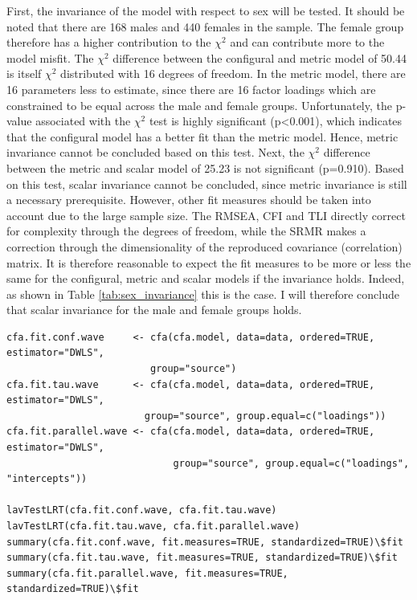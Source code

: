 \documentclass[11pt]{article}
\begin{document}
First, the invariance of the model with respect to sex will be tested. It
should be noted that there are 168 males and 440 females in the sample. The
female group therefore has a higher contribution to the $\chi^2$ and can
contribute more to the model misfit. The $\chi^2$ difference between the
configural and metric model of 50.44 is itself $\chi^2$ distributed with 16
degrees of freedom. In the metric model, there are 16 parameters less to
estimate, since there are 16 factor loadings which are constrained to be equal
across the male and female groups. Unfortunately, the p-value associated with
the $\chi^2$ test is highly significant (p<0.001), which indicates that the
configural model has a better fit than the metric model. Hence, metric
invariance cannot be concluded based on this test. Next, the $\chi^2$ difference
between the metric and scalar model of 25.23 is not significant (p=0.910). Based
on this test, scalar invariance cannot be concluded, since metric invariance is
still a necessary prerequisite. However, other fit measures should be taken into
account due to the large sample size. The RMSEA, CFI and TLI directly correct
for complexity through the degrees of freedom, while the SRMR makes a correction
through the dimensionality of the reproduced covariance (correlation) matrix.
It is therefore reasonable to expect the fit measures to be more or less
the same for the configural, metric and scalar models if the invariance holds.
Indeed, as shown in Table \ref{tab:sex_invariance} this is the case. I will
therefore conclude that scalar invariance for the male and female groups holds.

\begin{minipage}{\linewidth}
\begin{lstlisting}
cfa.fit.conf.wave     <- cfa(cfa.model, data=data, ordered=TRUE, estimator="DWLS",
                         group="source")
cfa.fit.tau.wave      <- cfa(cfa.model, data=data, ordered=TRUE, estimator="DWLS",
                        group="source", group.equal=c("loadings"))
cfa.fit.parallel.wave <- cfa(cfa.model, data=data, ordered=TRUE, estimator="DWLS",
                             group="source", group.equal=c("loadings", "intercepts"))

lavTestLRT(cfa.fit.conf.wave, cfa.fit.tau.wave)
lavTestLRT(cfa.fit.tau.wave, cfa.fit.parallel.wave)
summary(cfa.fit.conf.wave, fit.measures=TRUE, standardized=TRUE)\$fit
summary(cfa.fit.tau.wave, fit.measures=TRUE, standardized=TRUE)\$fit
summary(cfa.fit.parallel.wave, fit.measures=TRUE, standardized=TRUE)\$fit
\end{lstlisting}
\end{minipage}
\end{document}
